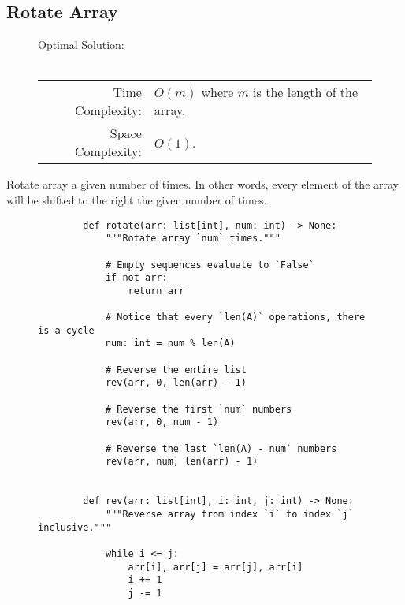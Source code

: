 
\subsection{Rotate Array}

\begin{figure}[H]
    Optimal Solution:\\\\
    \begin{tabular}{rl}
        Time Complexity:& \(O(m)\) where \(m\) is the length of the array.\\
        Space Complexity:& \(O(1)\).
    \end{tabular}
\end{figure}

Rotate array a given number of times. In other words, every element of the
array will be shifted to the right the given number of times.

\begin{figure}[H]
    \centering
    \begin{verbatim}
        def rotate(arr: list[int], num: int) -> None:
            """Rotate array `num` times."""

            # Empty sequences evaluate to `False`
            if not arr:
                return arr

            # Notice that every `len(A)` operations, there is a cycle
            num: int = num % len(A)

            # Reverse the entire list
            rev(arr, 0, len(arr) - 1)

            # Reverse the first `num` numbers
            rev(arr, 0, num - 1)

            # Reverse the last `len(A) - num` numbers
            rev(arr, num, len(arr) - 1)


        def rev(arr: list[int], i: int, j: int) -> None:
            """Reverse array from index `i` to index `j` inclusive."""

            while i <= j:
                arr[i], arr[j] = arr[j], arr[i]
                i += 1
                j -= 1
    \end{verbatim}
\end{figure}
